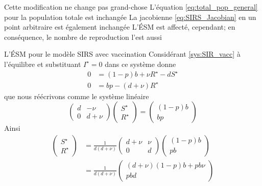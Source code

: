 \documentclass[aspectratio=169]{beamer}\usepackage[]{graphicx}\usepackage[]{xcolor}
\begin{document}
\begin{frame}{Cette modification ne change pas grand-chose}
L'équation \eqref{eq:total_pop_general} pour la population totale est inchangée
\vfill
La jacobienne \eqref{eq:SIRS_Jacobian} en un point arbitraire est également inchangée
\vfill
L'ÉSM est affecté, cependant; en conséquence, le nombre de reproduction l'est aussi
\end{frame}

\begin{frame}{L'ÉSM pour le modèle SIRS avec vaccination}
Considérant \eqref{sys:SIR_vacc} à l'équilibre et substituant $I^\star=0$ dans ce système donne
\begin{align*}
0 &= (1-p)b+\nu R^\star-dS^\star \\
0 &= bp-(d+\nu)R^\star
\end{align*}
que nous réécrivons comme le système linéaire
\[
\begin{pmatrix}
d & -\nu \\ 0 & d+\nu
\end{pmatrix}
\begin{pmatrix}
S^\star \\ R^\star
\end{pmatrix}
=
\begin{pmatrix}
(1-p)b \\ bp
\end{pmatrix}
\]
Ainsi
\begin{align*}
\begin{pmatrix}
S^\star \\ R^\star
\end{pmatrix}
&= \frac{1}{d(d+\nu)}
\begin{pmatrix}
d+\nu & \nu \\ 0 & d
\end{pmatrix}
\begin{pmatrix}
(1-p)b \\ pb
\end{pmatrix} \\
&= \frac{1}{d(d+\nu)}
\begin{pmatrix}
(d+\nu)(1-p)b+pb\nu \\ pbd
\end{pmatrix}
\end{align*}
\end{frame}
\end{document}
